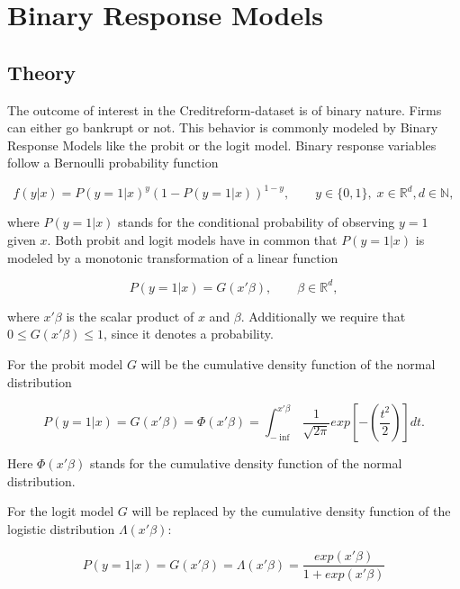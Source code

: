 \documentclass{article}
\begin{document}
\section{Binary Response Models}
\subsection{Theory}

The outcome of interest in the Creditreform-dataset is of binary nature. Firms can either go bankrupt or not. This behavior is commonly modeled by Binary Response Models like the probit or the logit model. Binary response variables follow a Bernoulli probability function

\begin{equation}
f(y|x) = P(y=1|x)^y\left(1-P(y=1|x)\right)^{1-y},\qquad y\in \{0,1\},\; x\in \mathbb{R}^d, d \in \mathbb{N},
\end{equation}

where $P(y=1|x)$ stands for the conditional probability of observing $y=1$ given $x$. Both probit and logit models have in common that $P(y=1|x)$ is modeled by a monotonic transformation of a linear function

\begin{equation}
P(y=1|x) = G(x \prime \beta), \qquad \beta \in \mathbb{R}^d,
\end{equation}

where $x \prime \beta$ is the scalar product of $x$ and $\beta$. Additionally we require that $0 \leq G(x \prime \beta) \leq 1$, since it denotes a probability.

For the probit model $G$ will be the cumulative density function of the normal distribution

\begin{equation}
P(y=1|x) = G(x \prime \beta) = \Phi(x \prime \beta) = \int_{-\inf}^{x \prime \beta} \frac{1}{\sqrt{2\pi}}exp\left[-(\frac{t^2}{2})\right]dt.
\end{equation}

Here $\Phi(x \prime \beta)$ stands for the cumulative density function of the normal distribution.

For the logit model $G$ will be replaced by the cumulative density function of the logistic distribution $\Lambda(x \prime \beta)$:

\begin{equation}
P(y=1|x) = G(x \prime \beta) = \Lambda(x \prime \beta) = \frac{exp(x \prime \beta)}{1+exp(x \prime \beta)}
\end{equation}
\end{document}
